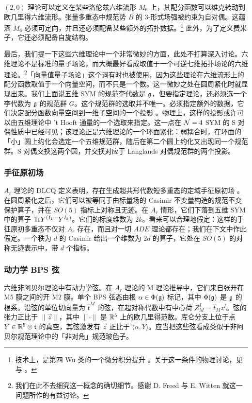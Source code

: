 $(2,0)$ 理论可以定义在某些洛伦兹六维流形 $M_6$ 上，其配分函数可以维克转动到欧几里得六维流形。张量多重态中规范势 $B$ 的 $3$-形式场强被约束为自对偶。这蕴涵 $M_6$ 必须可定向，并且还必须配备某些额外的拓扑数据。\footnote{技术上，是第四 Wu 类的一个微分积分提升 \cite{Hopkins:2002rd}。关于这一条件的物理讨论，见 \cite{Witten:1996hc} 与 \cite{Belov:2006jd}。}
此外，为了定义费米子，它还必须配备自旋结构。

最后，我们提一下这些六维理论中一个非常微妙的方面，此处不打算深入讨论。六维理论不是标准的量子场论，而大概最好看成取值于一个可逆七维拓扑场论的六维理论。\footnote{我们在此不去细究这一概念的确切细节。感谢 D. Freed 与 E. Witten 就这一问题所作的有益讨论。}「向量值量子场论」这个词有时也被使用，因为这些理论在六维流形上的配分函数取值于一个向量空间，而不只是一个数。这一微妙之处在圆周紧化时就显现出来。我们上面说五维 SYM 的规范李代数是 $\mathfrak{g}$，但要指定理论，还必须选一个李代数为 $\mathfrak{g}$ 的规范群 $G$。这个规范群的选取并不唯一。必须指定额外的数据，它们决定配分函数向量空间到一维子空间的一个投影 \cite{Witten:2009at}。物理上，这样的投影或许可以由五维理论中 't Hooft 通量的一个选取来指定。这一点在 ${\cal N}=4$ SYM 的 S 对偶性质中已经可见；该理论正是六维理论的一个环面紧化：弱耦合时，在环面的「小」圆上约化会选定一个五维规范群，随后在第二个圆上约化又出现同一个规范群。S 对偶交换这两个圆，并交换对应于 Langlands 对偶规范群的两个投影。


\subsubsection{手征原初场}

$A_r$ 理论的 DLCQ 定义表明，存在生成超共形代数短多重态的定域手征原初场 \cite{Aharony:1997an,Bhattacharya:2008zy}。在圆周紧化之后，它们可以被等同于由标量场的 Casimir 不变量构造的规范不变保护算子，并在 $SO(5)$ 指标上对称且无迹。在 $A_r$ 情形，它们下落到五维 SYM 中的算子 ${\operatorname{Tr}} Y^{(I_1 \cdots} Y^{I_k)}$。它们的标度维数为 $2k$。看来可以合理地假定：这样的手征原初多重态不仅对 $A_r$ 存在，而且对一切 $ADE$ 理论都存在；我们在下文中作此假定。一个秩为 $d$ 的 Casimir 给出一个维数为 $2d$ 的算子，它处在 $SO(5)$ 的对称无迹表示中，带 $d$ 个指标。


\subsubsection{动力学 BPS 弦}

六维非阿贝尔理论中有动力学弦。在 $A_r$ 理论的 M 理论推导中，它们来自张开在 M5 膜之间的开 M2 膜。单个 BPS 弦态由根 $\alpha\in\Phi(\mathfrak{g})$ 标记，其中 $\Phi(\mathfrak{g})$ 是 $\mathfrak{g}$ 的根系。沿弦的单位切向量为 $\hat t^M$ 的弦，在超对称代数中有中心荷 $Z_M^I = \hat t_M z^I$。弦的张力正比于 $\parallel \vec z \parallel$，其中 $\parallel \cdot \parallel$ 是 $\mathbb{R}^5$ 上的欧几里得范数。库仑分支上位于点 $Y\in \mathbb{R}^5 \otimes \mathfrak{t}$ 的真空，其弦激发有 $\vec z$ 正比于 $\langle \alpha, Y\rangle$。应当把这些弦看成类似于非阿贝尔规范理论中的「非对角」规范玻色子。


